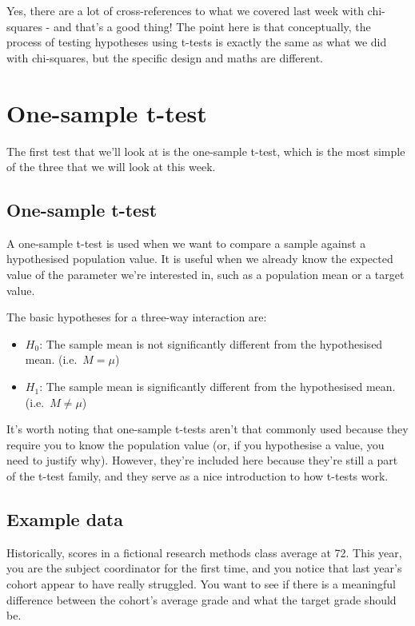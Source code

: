 \documentclass[
]{book}
\providecommand{\tightlist}{%
  \setlength{\itemsep}{0pt}\setlength{\parskip}{0pt}}
\begin{document}
Yes, there are a lot of cross-references to what we covered last week with chi-squares - and that's a good thing! The point here is that conceptually, the process of testing hypotheses using t-tests is exactly the same as what we did with chi-squares, but the specific design and maths are different.

\section{One-sample t-test}\label{one-sample-t-test}

The first test that we'll look at is the one-sample t-test, which is the most simple of the three that we will look at this week.

\subsection{One-sample t-test}\label{one-sample-t-test-1}

A one-sample t-test is used when we want to compare a sample against a hypothesised population value. It is useful when we already know the expected value of the parameter we're interested in, such as a population mean or a target value.

The basic hypotheses for a three-way interaction are:

\begin{itemize}
\tightlist
\item
  \(H_0\): The sample mean is not significantly different from the hypothesised mean. (i.e.~\(M = \mu\))
\item
  \(H_1\): The sample mean is significantly different from the hypothesised mean. (i.e.~\(M \neq \mu\))
\end{itemize}

It's worth noting that one-sample t-tests aren't that commonly used because they require you to know the population value (or, if you hypothesise a value, you need to justify why). However, they're included here because they're still a part of the t-test family, and they serve as a nice introduction to how t-tests work.

\subsection{Example data}\label{example-data}

Historically, scores in a fictional research methods class average at 72. This year, you are the subject coordinator for the first time, and you notice that last year's cohort appear to have really struggled. You want to see if there is a meaningful difference between the cohort's average grade and what the target grade should be.
\end{document}

